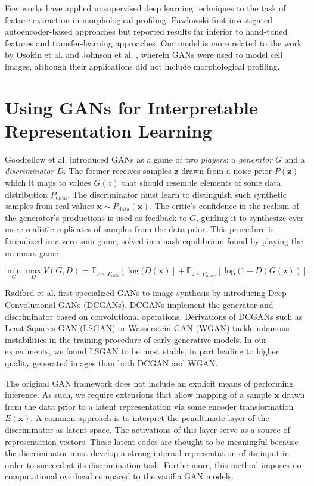 \documentclass{article}
\begin{document}
Few works have applied unsupervised deep learning techniques to the task of
feature extraction in morphological profiling. Pawlowski \cite{pawlowski2016msc}
first investigated autoencoder-based approaches but reported results far
inferior to hand-tuned features and transfer-learning approaches. Our model is
more related to the work by Osokin et al. \cite{osokin2017gans} and Johnson et
al. \cite{johnson2017generative}, wherein GANs were used to model cell
images, although their applications did not include morphological profiling.

\section{Using GANs for Interpretable Representation Learning}

Goodfellow et al. \cite{goodfellow2014generative} introduced GANs as a game of
two \emph{players}: a \emph{generator} $G$ and a \emph{discriminator} $D$. The
former receives samples $\mathbf{z}$ drawn from a noise prior $P(\mathbf{z})$
which it maps to values $G(z)$ that should resemble elements of some data
distribution $P_{\text{data}}$. The discriminator must learn to distinguish such
synthetic samples from real values $\mathbf{x} \sim
P_{\text{data}}(\mathbf{x})$. The critic's confidence in the realism of the
generator's productions is used as feedback to $G$, guiding it to synthesize
ever more realistic replicates of samples from the data prior. This procedure is
formalized in a zero-sum game, solved in a nash equilibrium found by playing the
minimax game

$$\min_G \max_D V(G, D) = \mathbb{E}_{x \sim P_{data}}[\log(D(\mathbf{x})] + \mathbb{E}_{z \sim P_{noise}}[\log(1 - D(G(\mathbf{z}))].$$

Radford et al. \cite{radford2015unsupervised} first specialized GANs to image
synthesis by introducing Deep Convolutional GANs (DCGANs). DCGANs implement the
generator and discriminator based on convolutional operations. Derivations of
DCGANs such as Least Squares GAN (LSGAN) \cite{mao2016least} or Wasserstein GAN
(WGAN) \cite{arjovsky2017wasserstein} tackle infamous instabilities in the
training procedure of early generative models. In our experiments, we found
LSGAN to be most stable, in part leading to higher quality generated images than
both DCGAN and WGAN.

The original GAN framework does not include an explicit means of performing
inference. As such, we require extensions that allow mapping of a sample
$\mathbf{x}$ drawn from the data prior to a latent representation via some
encoder transformation $E(\mathbf{x})$. A common approach is to interpret the
penultimate layer of the discriminator as latent space. The activations of this
layer serve as a source of representation vectors. These latent codes are
thought to be meaningful because the discriminator must develop a strong
internal representation of its input in order to succeed at its discrimination
task. Furthermore, this method imposes no computational overhead compared to the
vanilla GAN models.
\end{document}
